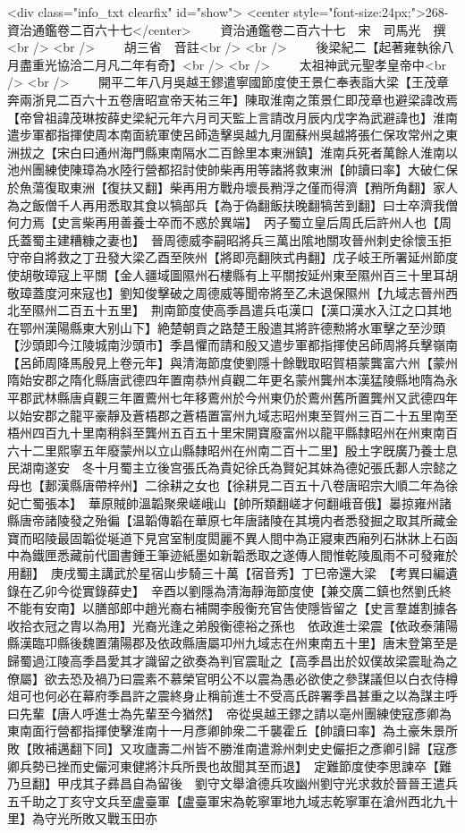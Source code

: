 <div class="info_txt clearfix" id="show">
<center style="font-size:24px;">268-資治通鑑卷二百六十七</center>
  　　資治通鑑卷二百六十七　宋　司馬光　撰<br />
<br />
　　胡三省　音註<br />
<br />
　　後梁紀二【起著雍執徐八月盡重光協洽二月凡二年有奇】<br />
<br />
　　太祖神武元聖孝皇帝中<br />
<br />
　　開平二年八月吳越王鏐遣寧國節度使王景仁奉表詣大梁【王茂章奔兩浙見二百六十五卷唐昭宣帝天祐三年】陳取淮南之策景仁即茂章也避梁諱改焉【帝曾祖諱茂琳按薛史梁紀元年六月司天監上言請改月辰内戊字為武避諱也】淮南遣步軍都指揮使周本南面統軍使呂師造擊吳越九月圍蘇州吳越將張仁保攻常州之東洲拔之【宋白曰通州海門縣東南隔水二百餘里本東洲鎮】淮南兵死者萬餘人淮南以池州團練使陳璋為水陸行營都招討使帥柴再用等諸將救東洲【帥讀曰率】大破仁保於魚蕩復取東洲【復扶又翻】柴再用方戰舟壞長矟浮之僅而得濟【矟所角翻】家人為之飯僧千人再用悉取其食以犒部兵【為于偽翻飯扶晚翻犒苦到翻】曰士卒濟我僧何力焉【史言柴再用善養士卒而不惑於異端】　丙子蜀立皇后周氏后許州人也【周氏蓋蜀主建糟糠之妻也】　晉周德威李嗣昭將兵三萬出隂地關攻晉州刺史徐懷玉拒守帝自將救之丁丑發大梁乙酉至陜州【將即亮翻陜式冉翻】戊子岐王所署延州節度使胡敬璋寇上平關【金人疆域圖隰州石樓縣有上平關按延州東至隰州百三十里耳胡敬璋蓋度河來寇也】劉知俊擊破之周德威等聞帝將至乙未退保隰州【九域志晉州西北至隰州二百五十五里】　荆南節度使高季昌遣兵屯漢口【漢口漢水入江之口其地在鄂州漢陽縣東大别山下】絶楚朝貢之路楚王殷遣其將許德勲將水軍擊之至沙頭【沙頭即今江陵城南沙頭市】季昌懼而請和殷又遣步軍都指揮使呂師周將兵擊嶺南【呂師周降馬殷見上卷元年】與清海節度使劉隱十餘戰取昭賀梧蒙龔富六州【蒙州隋始安郡之隋化縣唐武德四年置南恭州貞觀二年更名蒙州龔州本漢猛陵縣地隋為永平郡武林縣唐貞觀三年置鷰州七年移鷰州於今州東仍於鷰州舊所置龔州又武德四年以始安郡之龍平豪靜及蒼梧郡之蒼梧置富州九域志昭州東至賀州三百二十五里南至梧州四百九十里南稍斜至龔州五百五十里宋開寶廢富州以龍平縣隸昭州在州東南百六十二里熙寧五年廢蒙州以立山縣隸昭州在州南二百十二里】殷土字旣廣乃養士息民湖南遂安　冬十月蜀主立後宫張氏為貴妃徐氏為賢妃其妹為德妃張氏郪人宗懿之母也【郪漢縣唐帶梓州】二徐耕之女也【徐耕見二百五十八卷唐昭宗大順二年為徐妃亡蜀張本】　華原賊帥溫韜聚衆嵯峨山【帥所類翻嵯才何翻峨音俄】㬥掠雍州諸縣唐帝諸陵發之殆徧【温韜傳韜在華原七年唐諸陵在其境内者悉發掘之取其所藏金寶而昭陵最固韜從埏道下見宫室制度閎麗不異人間中為正寢東西廂列石牀牀上石函中為鐵匣悉藏前代圖書鍾王筆迹紙墨如新韜悉取之遂傳人間惟乾陵風雨不可發雍於用翻】　庚戌蜀主講武於星宿山步騎三十萬【宿音秀】丁巳帝還大梁　【考異曰編遺錄在乙卯今從實錄薛史】　辛酉以劉隱為清海靜海節度使【兼交廣二鎮也然劉氏終不能有安南】以膳部郎中趙光裔右補闕李殷衡充官告使隱皆留之【史言羣雄割據各收拾衣冠之胄以為用】光裔光逢之弟殷衡德裕之孫也　依政進士梁震【依政泰蒲陽縣漢臨卭縣後魏置蒲陽郡及依政縣唐屬卭州九域志在州東南五十里】唐末登第至是歸蜀過江陵高季昌愛其才識留之欲奏為判官震耻之【高季昌出於奴僕故梁震耻為之僚屬】欲去恐及禍乃曰震素不慕榮官明公不以震為愚必欲使之參謀議但以白衣侍樽俎可也何必在幕府季昌許之震終身止稱前進士不受高氏辟署季昌甚重之以為謀主呼曰先輩【唐人呼進士為先輩至今猶然】　帝從吳越王鏐之請以亳州團練使寇彥卿為東南面行營都指揮使擊淮南十一月彥卿帥衆二千襲霍丘【帥讀曰率】為土豪朱景所敗【敗補邁翻下同】又攻廬壽二州皆不勝淮南遣滁州刺史史儼拒之彥卿引歸【寇彥卿兵勢已挫而史儼河東健將汴兵所畏也故聞其至而退】　定難節度使李思諫卒【難乃旦翻】甲戌其子彞昌自為留後　劉守文舉滄德兵攻幽州劉守光求救於晉晉王遣兵五千助之丁亥守文兵至盧臺軍【盧臺軍宋為乾寧軍地九域志乾寧軍在滄州西北九十里】為守光所敗又戰玉田亦